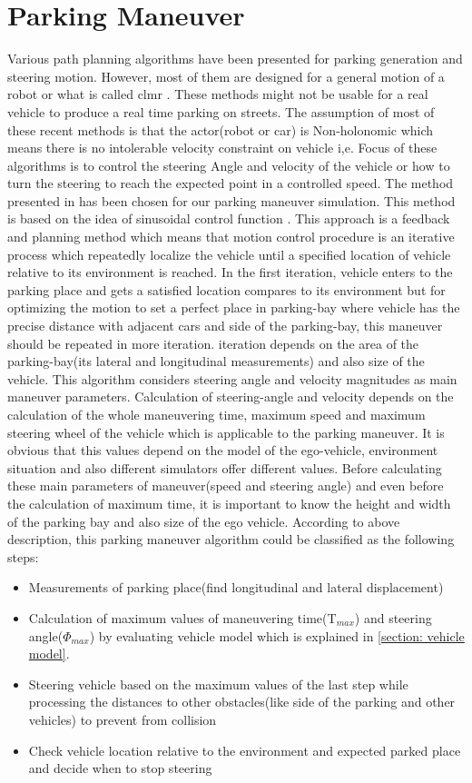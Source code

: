 \chapter{Parking Maneuver}\label{chapter:Parking Maneuver}
Various path planning algorithms have been presented for parking generation and steering motion. However, most of them are designed for a general motion of a robot or what is called \acrfull{clmr} \cite{CLMR}. These methods might not be usable for a real vehicle to produce a real time parking on streets. The assumption of most of these recent methods is that the actor(robot or car) is Non-holonomic which means there is no intolerable velocity constraint on vehicle \cite{parkingManeuver} i,e. Focus of these algorithms is to control the steering Angle and velocity of the vehicle or how to turn the steering to reach the expected point in a controlled speed. The method presented in \cite{parkingManeuver} has been chosen for our parking maneuver simulation. This method is based on the idea of sinusoidal control function \cite{sinusoids}. This approach is a feedback and planning method which means that motion control procedure is an iterative process which repeatedly localize the vehicle until a specified location of vehicle relative to its environment is reached. In the first iteration, vehicle enters to the parking place and gets a satisfied location compares to its environment but for optimizing the motion to set a perfect place in parking-bay where vehicle has the precise distance with adjacent cars and side of the parking-bay, this maneuver should be repeated in more iteration. iteration depends on the area of the parking-bay(its lateral and longitudinal measurements) and also size of the vehicle. This algorithm considers steering angle and velocity magnitudes as main maneuver parameters. Calculation of steering-angle and velocity depends on the calculation of the whole maneuvering time, maximum speed and maximum steering wheel of the vehicle which is applicable to the parking maneuver. It is obvious that this values depend on the model of the ego-vehicle, environment situation and also different simulators offer different values. Before calculating these main parameters of maneuver(speed and steering angle) and even before the calculation of maximum time, it is important to know the height and width of the parking bay and also size of the ego vehicle. According to above description, this parking maneuver algorithm could be classified as the following steps:
\begin{itemize}
\item Measurements of parking place(find longitudinal and lateral displacement)
\item Calculation of maximum values of maneuvering time(T$_{max}$) and steering   
angle($\Phi_{max}$) by evaluating vehicle model  which is explained in \ref{section: vehicle model}.
\item Steering vehicle based on the maximum values of the last step while processing the distances to other obstacles(like side of the parking and other vehicles) to prevent from collision
\item Check vehicle location relative to the environment and expected parked place and decide when to stop steering
\end{itemize}
